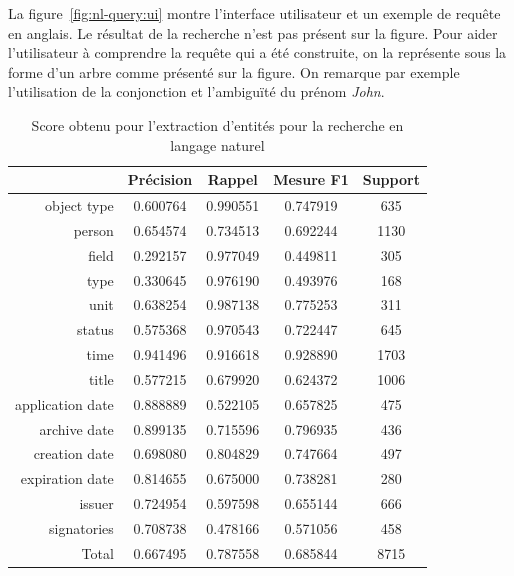 La figure~\ref{fig:nl-query:ui} montre l'interface utilisateur et un exemple de requête en anglais.
Le résultat de la recherche n'est pas présent sur la figure.
Pour aider l'utilisateur à comprendre la requête qui a été construite, on la représente sous la forme d'un arbre comme présenté sur la figure.
On remarque par exemple l'utilisation de la conjonction  et l'ambiguïté du prénom \emph{John}.

\begin{table}[htb]
    \centering
    \begin{tabular}{r|cccc}
                         & Précision      & Rappel         & Mesure F1      & Support    \\
        \hline
        \hline
        object type      & \num{0,600764} & \num{0,990551} & \num{0,747919} & \num{ 635} \\
        person           & \num{0,654574} & \num{0,734513} & \num{0,692244} & \num{1130} \\
        field            & \num{0,292157} & \num{0,977049} & \num{0,449811} & \num{ 305} \\
        type             & \num{0,330645} & \num{0,976190} & \num{0,493976} & \num{ 168} \\
        unit             & \num{0,638254} & \num{0,987138} & \num{0,775253} & \num{ 311} \\
        status           & \num{0,575368} & \num{0,970543} & \num{0,722447} & \num{ 645} \\
        \hline
        time             & \num{0,941496} & \num{0,916618} & \num{0,928890} & \num{1703} \\
        title            & \num{0,577215} & \num{0,679920} & \num{0,624372} & \num{1006} \\
        \hline
        application date & \num{0,888889} & \num{0,522105} & \num{0,657825} & \num{ 475} \\
        archive date     & \num{0,899135} & \num{0,715596} & \num{0,796935} & \num{ 436} \\
        creation date    & \num{0,698080} & \num{0,804829} & \num{0,747664} & \num{ 497} \\
        expiration date  & \num{0,814655} & \num{0,675000} & \num{0,738281} & \num{ 280} \\
        issuer           & \num{0,724954} & \num{0,597598} & \num{0,655144} & \num{ 666} \\
        signatories      & \num{0,708738} & \num{0,478166} & \num{0,571056} & \num{ 458} \\
        \hline
        Total            & \num{0,667495} & \num{0,787558} & \num{0,685844} & \num{8715}
    \end{tabular}
    \caption{Score obtenu pour l'extraction d'entités pour la recherche en langage naturel}
    \label{tab:nl-query:result}
\end{table}


